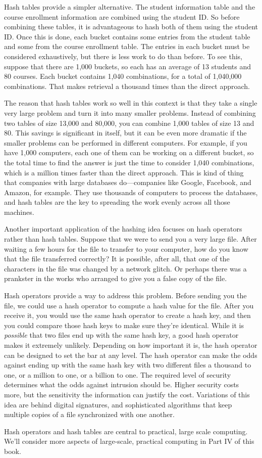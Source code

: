 Hash tables provide a simpler alternative. The student information table
and the course enrollment information are combined using the student ID.
So before combining these tables, it is advantageous to hash both of them
using the student ID. Once this is done, each bucket contains some entries
from the student table and some from the course enrollment table. The entries
in each bucket must be considered exhaustively, but there is less work to do
than before.
To see this, suppose that there are 1,000 buckets, so
each has an average of 13 students and 80 courses. Each bucket
contains 1,040 combinations, for a total of 1,040,000 combinations. 
That makes retrieval a thousand times than the direct approach.

The reason that hash tables work so well in this context is that they take
a single very large problem and turn it into many smaller problems. Instead
of combining two tables of size 13,000 and 80,000, you can combine 1,000
tables of size 13 and 80. This savings is significant in itself, but it can
be even more dramatic if the smaller problems can be performed in different
computers. For example, if you have 1,000 computers, each one of them can be
working on a different bucket, so the total time to find the answer is
just the time to consider 1,040 combinations, which is a million times
faster than the direct approach. 
This is kind of thing that companies with large databases do---companies like Google, Facebook, and Amazon,
for example. They use thousands of computers to process the databases, and
hash tables are the key to spreading the work evenly across all those
machines.

Another important application of the hashing idea focuses on hash operators
rather than hash tables. 
Suppose that we were to send you a very large file. After waiting a few hours
for the file to transfer to your computer, how do you know that the file
transferred correctly? It is possible, after all, that one of the characters
in the file was changed by a network glitch. Or perhaps there was a prankster
in the works who arranged to give you a false copy of the file.

Hash operators provide a way to address this problem.
Before sending you the file, we could use a hash operator to compute a hash
value for the file. After you receive it, you would use the same hash operator
to create a hash key, and then you could compare those hash keys to make sure
they're identical. While it is \emph{possible} that two files end up with the
same hash key, a good hash operator makes it extremely unlikely.
Depending on how important it is, the hash operator can be designed to set
the bar at any level. The hash operator can make the odds against
ending up with the same hash key with two different files a thousand to one,
or a million to one, or a billion to one. The required level of security
determines what the odds against intrusion should be. Higher security
costs more, but the sensitivity the information can justify the cost.
Variations of this idea are behind digital signatures, and sophisticated
algorithms that keep multiple copies of a file synchronized with one another.

Hash operators and hash tables are central to practical, large scale computing. 
We'll consider more aspects of large-scale, practical computing
in Part IV of this book.

